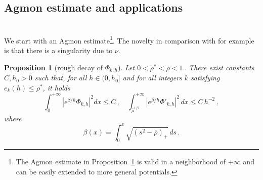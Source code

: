 \documentclass[11pt]{amsart}
\numberwithin{equation}{section}
\newtheorem{proposition}[theorem]{Proposition}
\theoremstyle{remark}
\begin{document}
\subsection{Agmon estimate and applications}\label{subsec:Agmon}~\\ 
%
We start with an Agmon estimate\footnote{The  Agmon estimate in Proposition~\ref{prop:dc-Phi} is valid in a neighborhood of $+\infty$ and can be easily extended to more general potentials.}. The novelty in comparison with for example \cite{HS} is that there is a singularity due to $\nu$.


    \begin{proposition}[rough decay of $\Phi_{k,h}$]\label{prop:dc-Phi}
    Let $0<\rho^*<\bar\rho<1\,$. There exist constants $C,h_0>0$ such that, for all $h\in(0,h_0]$ and for all integers $k$ satisfying $e_k(h)\leq \rho^*$, it holds 
    \[ \int_{0}^{+\infty}|e^{\beta/h}\Phi_{k,h}|^2dx\leq C\,,\quad \int_{\bar\rho^{1/2}}^{+\infty}|e^{\beta/h}\Phi'_{k,h}|^2\,dx\leq C\, h^{-2}\,,\]
    where 
    \[\beta(x)=\int_0^x\sqrt{(s^2-\bar\rho)_+}\,ds\,.\]
\end{proposition}
\end{document}
